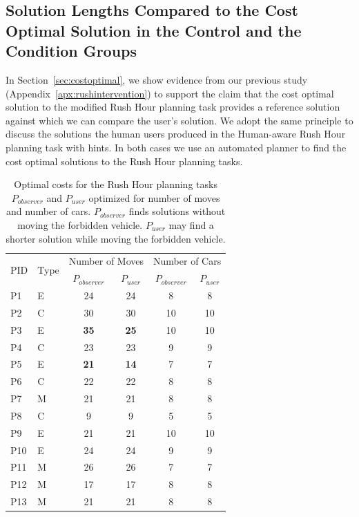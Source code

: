 \subsection{Solution Lengths Compared to the Cost Optimal Solution in the Control and the Condition Groups}
In Section~\ref{sec:costoptimal}, we show evidence from our previous study (Appendix~\ref{apx:rushintervention}) to support the claim that the cost optimal solution to the modified Rush Hour planning task provides a reference solution against which we can compare the user’s solution.
We adopt the same principle to discuss the solutions the human users produced in the Human-aware Rush Hour planning task with hints.
In both cases we use an automated planner to find the cost optimal solutions to the Rush Hour planning tasks.

\begin{table}[tpb]
\caption{Optimal costs for the Rush Hour planning tasks $P_{observer}$ and $P_{user}$ optimized for number of moves and number of cars. $P_{observer}$ finds solutions without moving the forbidden vehicle. $P_{user}$ may find a shorter solution while moving the forbidden vehicle.}
\begin{tabular}{|l|l|c|c|c|c|}
\hline
\multirow{2}{*}{PID} & \multirow{2}{*}{Type} &\multicolumn{2}{l|}{Number of Moves} & \multicolumn{2}{l|}{Number of Cars} \\ \cline{3-6} 
   &  & $P_{observer}$ & $P_{user}$ & $P_{observer}$ & $P_{user}$ \\ \hline
P1 & E & 24   & 24     & 8    & 8      \\ 
P2 & C  & 30   & 30     & 10   & 10     \\ 
P3 & E  & \textbf{35}   & \textbf{25}     & 10   & 10     \\ 
P4 & C  & 23   & 23     & 9    & 9      \\ 
P5 & E  & \textbf{21}   & \textbf{14}     & 7    & 7      \\ 
P6 & C  & 22   & 22     & 8    & 8      \\ 
P7 & M & 21   & 21     & 8    & 8      \\ 
P8 & C  & 9    & 9      & 5    & 5      \\ 
P9 & E  & 21   & 21     & 10   & 10     \\
P10 & E & 24   & 24     & 9    & 9      \\ 
P11 & M & 26   & 26     & 7	   & 7		\\
P12 & M & 17   & 17     & 8    & 8		\\
P13  & M & 21   & 21	    & 8	   & 8		\\	\hline
\end{tabular}
\label{tab:optimals}
\end{table}

